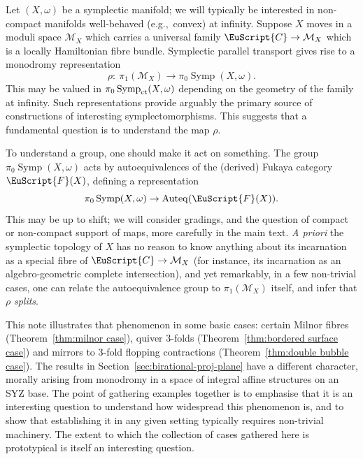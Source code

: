 \documentclass[pdftex]{sigma}
\newcommand{\scrF}{\EuScript{F}}
\newcommand{\scrC}{\EuScript{C}}
\DeclareMathOperator{\Symp}{Symp}
\theoremstyle{definition}
\numberwithin{equation}{section}
\begin{document}
Let $(X,\omega)$ be a symplectic manifold; we will typically be interested in non-compact manifolds well-behaved (e.g.,~convex) at infinity. Suppose $X$ moves in a moduli space $\mathcal{M}_X$ which carries a universal family $\scrC \to \mathcal{M}_X$ which is a locally Hamiltonian fibre bundle. Symplectic parallel transport gives rise to a monodromy representation
\begin{equation*} %
\rho\colon \ \pi_1(\mathcal{M}_X) \to \pi_0\Symp(X,\omega).
\end{equation*}
This may be valued in $\pi_0\Symp_{\rm ct}(X,\omega)$ depending on the geometry of the family at infinity. Such representations provide arguably the primary source of constructions of interesting symplectomorphisms. This suggests that a fundamental question is to understand the map $\rho$.

To understand a group, one should make it act on something. The group $\pi_0\Symp(X,\omega)$ acts by autoequivalences of the (derived) Fukaya category $\scrF(X)$, defining a representation
\begin{equation*} %
\pi_0\Symp(X,\omega) \to \mathrm{Auteq}(\scrF(X)).
\end{equation*}
This may be up to shift; we will consider gradings, and the question of compact or non-compact support of maps, more carefully in the main text.
\emph{A priori} the symplectic topology of $X$ has no reason to know anything about its incarnation as a special fibre of $\scrC \to \mathcal{M}_X$ (for instance, its incarnation as an algebro-geometric complete intersection), and yet remarkably, in a few non-trivial cases, one can relate the autoequivalence group to $\pi_1(\mathcal{M}_X)$ itself, and infer that $\rho$ \emph{splits}.

This note illustrates that phenomenon in some basic cases: certain Milnor fibres (Theorem~\ref{thm:milnor case}), quiver 3-folds (Theorem~\ref{thm:bordered surface case}) and mirrors to 3-fold flopping contractions (Theorem~\ref{thm:double bubble case}).
The results in Section~\ref{sec:birational-proj-plane}
have a different character, morally arising from monodromy in a space of integral affine structures on an SYZ base.
 The point of gathering examples together is to emphasise that it is an interesting question to understand how widespread this phenomenon is, and to show that establishing it in any given setting typically requires non-trivial machinery. The extent to which the collection of cases gathered here is prototypical is itself an interesting question.
\end{document}
